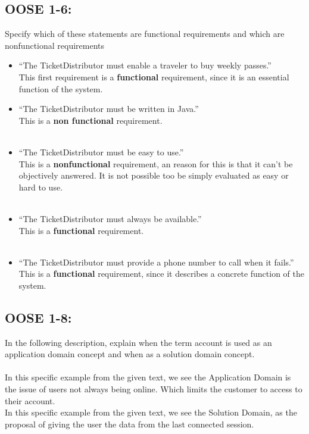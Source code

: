\documentclass[11pt,a4paper]{report}
\begin{document}
\subsection{OOSE 1-6:}
Specify which of these statements are functional requirements and which are
nonfunctional requirements
\begin{itemize}

\item “The TicketDistributor must enable a traveler to buy weekly passes.”\\
This first requirement is a \textbf{functional} requirement, since it is an essential function of the system.
\item “The TicketDistributor must be written in Java.”\\
This is a \textbf{non functional} requirement.\\\\
\item “The TicketDistributor must be easy to use.”\\
This is a \textbf{nonfunctional} requirement, an reason for this is that it can't be objectively answered. It is not possible too be simply evaluated as easy or hard to use.\\\\
\item “The TicketDistributor must always be available.”\\
This is a \textbf{functional} requirement. \\\\
\item “The TicketDistributor must provide a phone number to call when it fails.” \\
This is a \textbf{functional} requirement, since it describes a concrete function of the system.\\
\end{itemize}

\subsection{OOSE 1-8:}
In the following description, explain when the term account is used as an application domain concept and when as a solution domain concept.\\\\
In this specific example from the given text, we see the Application Domain is the issue of users not always being online. Which limits the customer to access to their account.\\
In this specific example from the given text, we see the Solution Domain, as the proposal of giving the user the data from the last connected session.\\
\newpage
\end{document}
